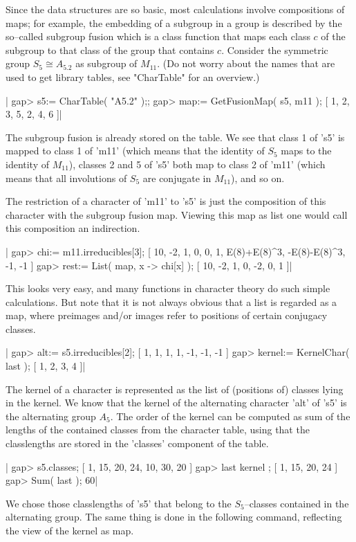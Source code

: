 Since  the  data  structures  are  so  basic,  most  calculations involve
compositions of maps; for example, the embedding of a subgroup in a group
is described by the so--called subgroup  fusion which is a class function
that maps each class  $c$ of the subgroup to that class of the group that
contains $c$.  Consider the symmetric group $S_5 \cong A_5.2$ as subgroup
of $M_{11}$.  (Do not worry about the names that are used to get  library
tables, see "CharTable" for an overview.)

|    gap> s5:= CharTable( "A5.2" );;
    gap> map:= GetFusionMap( s5, m11 );
    [ 1, 2, 3, 5, 2, 4, 6 ]|

The subgroup fusion is already stored on the table.  We see  that class 1
of 's5' is mapped  to class 1 of 'm11' (which means that the  identity of
$S_5$ maps to the identity of $M_{11}$), classes 2 and 5 of 's5' both map
to  class 2 of  'm11'  (which  means that  all involutions  of $S_5$  are
conjugate in $M_{11}$), and so on.

The restriction  of a character of 'm11' to 's5' is just the  composition
of this character with the subgroup fusion map.  Viewing this map as list
one would call this composition an indirection.

|    gap> chi:= m11.irreducibles[3];
    [ 10, -2, 1, 0, 0, 1, E(8)+E(8)^3, -E(8)-E(8)^3, -1, -1 ]
    gap> rest:= List( map, x -> chi[x] );
    [ 10, -2, 1, 0, -2, 0, 1 ]|

This looks very easy, and many  {\GAP}  functions  in character theory do
such simple calculations.  But note that  it is not always obvious that a
list is  regarded  as a  map,  where preimages  and/or  images  refer  to
positions of certain conjugacy classes.

|    gap> alt:= s5.irreducibles[2];
    [ 1, 1, 1, 1, -1, -1, -1 ]
    gap> kernel:= KernelChar( last );
    [ 1, 2, 3, 4 ]|

The kernel of a character  is  represented as the  list of (positions of)
classes lying in the kernel.  We know that the kernel of  the alternating
character 'alt' of 's5' is the alternating group $A_5$.  The order of the
kernel  can  be computed as sum of the lengths of the  contained  classes
from the character table, using that the  classlengths  are stored in the
'classes' component of the table.

|    gap> s5.classes;
    [ 1, 15, 20, 24, 10, 30, 20 ]
    gap> last{ kernel };
    [ 1, 15, 20, 24 ]
    gap> Sum( last );
    60|

We  chose those classlengths of  's5' that belong  to the  $S_5$--classes
contained  in the  alternating group.   The  same  thing  is  done in the
following command, reflecting the view of the kernel as map.

